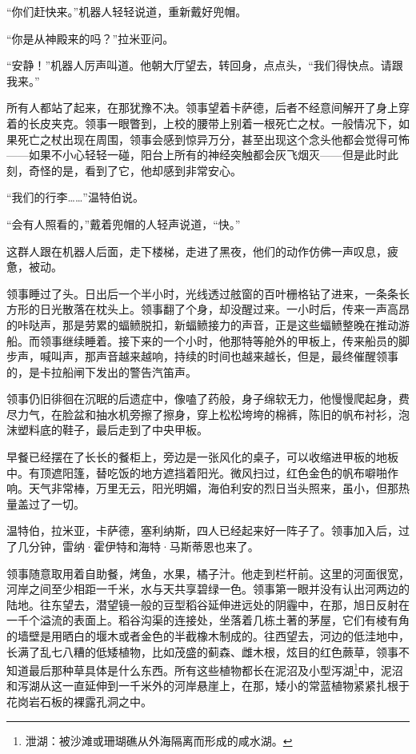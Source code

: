 \documentclass[AutoFakeBold=true]{book}
\begin{document}
``你们赶快来。''机器人轻轻说道，重新戴好兜帽。

``你是从神殿来的吗？''拉米亚问。

``安静！''机器人厉声叫道。他朝大厅望去，转回身，点点头，``我们得快点。请跟我来。''

所有人都站了起来，在那犹豫不决。领事望着卡萨德，后者不经意间解开了身上穿着的长皮夹克。领事一眼瞥到，上校的腰带上别着一根死亡之杖。一般情况下，如果死亡之杖出现在周围，领事会感到惊异万分，甚至出现这个念头他都会觉得可怖——如果不小心轻轻一碰，阳台上所有的神经突触都会灰飞烟灭——但是此时此刻，奇怪的是，看到了它，他却感到非常安心。

``我们的行李……''温特伯说。

``会有人照看的，''戴着兜帽的人轻声说道，``快。''

这群人跟在机器人后面，走下楼梯，走进了黑夜，他们的动作仿佛一声叹息，疲惫，被动。

\vspace*{1em}

领事睡过了头。日出后一个半小时，光线透过舷窗的百叶栅格钻了进来，一条条长方形的日光散落在枕头上。领事翻了个身，却没醒过来。一小时后，传来一声高昂的咔哒声，那是劳累的蝠鲼脱扣，新蝠鲼接力的声音，正是这些蝠鲼整晚在推动游船。而领事继续睡着。接下来的一个小时，他那特等舱外的甲板上，传来船员的脚步声，喊叫声，那声音越来越响，持续的时间也越来越长，但是，最终催醒领事的，是卡拉船闸下发出的警告汽笛声。

领事仍旧徘徊在沉眠的后遗症中，像嗑了药般，身子绵软无力，他慢慢爬起身，费尽力气，在脸盆和抽水机旁擦了擦身，穿上松松垮垮的棉裤，陈旧的帆布衬衫，泡沫塑料底的鞋子，最后走到了中央甲板。

早餐已经摆在了长长的餐柜上，旁边是一张风化的桌子，可以收缩进甲板的地板中。有顶遮阳篷，替吃饭的地方遮挡着阳光。微风扫过，红色金色的帆布噼啪作响。天气非常棒，万里无云，阳光明媚，海伯利安的烈日当头照来，虽小，但那热量盖过了一切。

温特伯，拉米亚，卡萨德，塞利纳斯，四人已经起来好一阵子了。领事加入后，过了几分钟，雷纳·霍伊特和海特·马斯蒂恩也来了。

领事随意取用着自助餐，烤鱼，水果，橘子汁。他走到栏杆前。这里的河面很宽，河岸之间至少相距一千米，水与天共享碧绿一色。领事第一眼并没有认出河两边的陆地。往东望去，潜望镜一般的豆型稻谷延伸进远处的阴霾中，在那，旭日反射在一千个溢流的表面上。稻谷沟渠的连接处，坐落着几栋土著的茅屋，它们有棱有角的墙壁是用晒白的堰木或者金色的半截橡木制成的。往西望去，河边的低洼地中，长满了乱七八糟的低矮植物，比如茂盛的蓟森、雌木根，炫目的红色蕨草，领事不知道最后那种草具体是什么东西。所有这些植物都长在泥沼及小型泻湖\footnote{泄湖：被沙滩或珊瑚礁从外海隔离而形成的咸水湖。}中，泥沼和泻湖从这一直延伸到一千米外的河岸悬崖上，在那，矮小的常蓝植物紧紧扎根于花岗岩石板的裸露孔洞之中。
\end{document}
